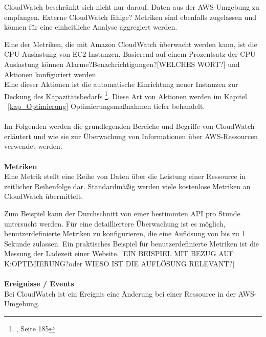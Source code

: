 CloudWatch beschränkt sich nicht nur darauf, Daten aus der AWS-Umgebung zu empfangen.  Externe CloudWatch fähige? Metriken sind ebenfalls zugelassen und können für eine einheitliche Analyse aggregiert werden.

Eine der Metriken, die mit Amazon CloudWatch überwacht werden kann, ist die CPU-Auslastung von EC2-Instanzen.
Basierend auf einem Prozentsatz der CPU-Auslastung können Alarme?Benachrichtigungen?[WELCHES WORT?] und Aktionen konfiguriert werden
\\
Eine dieser Aktionen ist die automatische Einrichtung neuer Instanzen zur Deckung des Kapazitätsbedarfs
\footnote{\cite{AWS1}, Seite 185}.
Diese Art von Aktionen werden im Kapitel ~\ref{kap_Optimierung} Optimierungsmaßnahmen tiefer behandelt.
\\\\
Im Folgenden werden die grundlegenden Bereiche und Begriffe von CloudWatch erläutert und wie sie zur Überwachung von Informationen über AWS-Ressourcen verwendet werden.
\\\\
\textbf{Metriken} \\
Eine Metrik stellt eine Reihe von Daten über die Leistung einer Ressource in zeitlicher Reihenfolge dar. Standardmäßig werden viele kostenlose Metriken an CloudWatch übermittelt.

Zum Beispiel kann der Durchschnitt von einer bestimmten API pro Stunde untersucht werden.
Für eine detailliertere Überwachung ist es möglich, benutzerdefinierte Metriken zu konfigurieren, die eine Auflösung von bis zu 1 Sekunde zulassen. Ein praktisches Beispiel für benutzerdefinierte Metriken ist die Messung der Ladezeit einer Website.
[EIN BEISPIEL MIT BEZUG AUF K:OPTIMIERUNG?oder WIESO IST DIE AUFLÖSUNG RELEVANT?]
\\\\
\textbf{Ereignisse / Events} 
\\
Bei CloudWatch ist ein Ereignis eine Änderung bei einer Ressource in der AWS-Umgebung.
